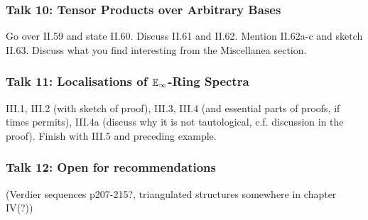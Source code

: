 \documentclass{article}
\begin{document}
\subsubsection*{Talk 10: Tensor Products over Arbitrary Bases}
Go over II.59 and state II.60. Discuss II.61 and II.62.
Mention II.62a-c and sketch II.63. Discuss what you find interesting
from the Miscellanea section.

\subsubsection*{Talk 11: Localisations of $\mathbb{E}_\infty$-Ring Spectra}
III.1, III.2 (with sketch of proof), III.3, III.4 (and essential parts
of proofs, if times permits), III.4a (discuss why it is not tautological,
c.f. discussion in the proof). Finish with III.5 and preceding example.

\subsubsection*{Talk 12: Open for recommendations }
(Verdier sequences p207-215?, triangulated structures somewhere in chapter IV(?))

\printbibliography
\end{document}
